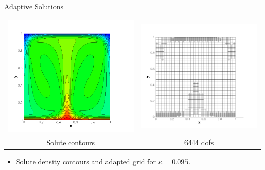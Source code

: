 \documentclass[compress,12pt]{beamer}
\begin{document}
\begin{frame}{Adaptive Solutions}
{\begin{center}
      \begin{tabular}{cc} \\
	\includegraphics[width=.5\textwidth]{figures/s_adapt_kappa_0_095}&
	\includegraphics[width=.5\textwidth]{figures/grid_adapt_kappa_0_095}\\
	Solute contours &
	6444 dofs
      \end{tabular}\end{center}
    \begin{itemize}
      
    \item Solute density contours and adapted grid for $\kappa=0.095$.
    \end{itemize}
  }

  {
    \begin{center}


\end{center}}
\end{frame}
\end{document}
